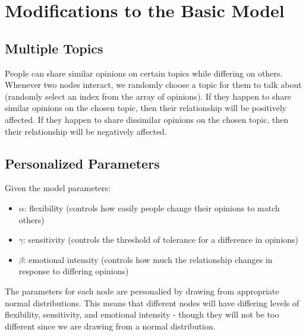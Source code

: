 \documentclass[11pt]{article}
\providecommand{\tightlist}{%
      \setlength{\itemsep}{0pt}\setlength{\parskip}{0pt}}
\begin{document}
    
    \begin{center}
    \end{center}

    
    \begin{center}
    \end{center}

    
    \newpage
    \section{Modifications to the Basic Model}

\subsection{Multiple Topics}

People can share similar opinions on certain topics while differing on
others. Whenever two nodes interact, we randomly choose a topic for them
to talk about (randomly select an index from the array of opinions). If
they happen to share similar opinions on the chosen topic, then their
relationship will be positively affected. If they happen to share
dissimilar opinions on the chosen topic, then their relationship will be
negatively affected.

\subsection{Personalized Parameters}

Given the model parameters:

\begin{itemize}
\tightlist
\item
  \(\alpha\): flexibility (controls how easily people change their
  opinions to match others)
\item
  \(\gamma\): sensitivity (controls the threshold of tolerance for a
  difference in opinions)
\item
  \(\beta\): emotional intensity (controls how much the relationship
  changes in response to differing opinions)
\end{itemize}

The parameters for each node are personalied by drawing from appropriate
normal distributions. This means that different nodes will have
differing levels of flexibility, sensitivity, and emotional intensity -
though they will not be too different since we are drawing from a normal
distribution.
\end{document}
